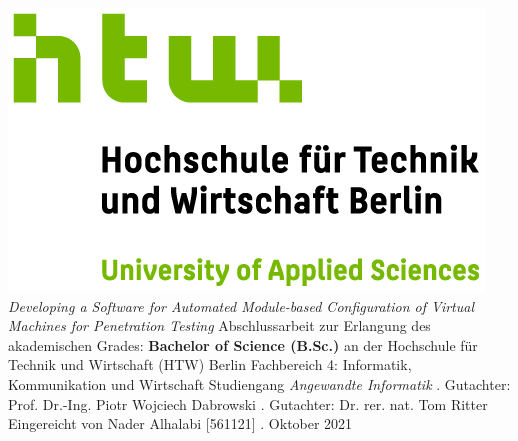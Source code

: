 \begin{titlepage}
\begin{center}
\includegraphics{resources/logo/HTW_Berlin_Logo_farbig.jpg}
\linebreak[4]
\linebreak[4]
\linebreak[4]
\linebreak[4]
\textit{\large Developing a Software for Automated
Module-based Configuration of Virtual Machines
for Penetration Testing}
\linebreak[4]
\linebreak[4]
\linebreak[4]
Abschlussarbeit
\linebreak[4]
\linebreak[4]
zur Erlangung des akademischen Grades:
\linebreak[4]
\linebreak[4]
\textbf{Bachelor of Science (B.Sc.)}
\linebreak[4]
\linebreak[4]
an der
\linebreak[4]
\linebreak[4]
Hochschule f\"ur Technik und Wirtschaft (HTW) Berlin
\linebreak[4]
Fachbereich 4: Informatik, Kommunikation und Wirtschaft
\linebreak[4]
Studiengang \textit{Angewandte Informatik}
\linebreak[4]
\linebreak[4]
. Gutachter: Prof. Dr.-Ing. Piotr Wojciech Dabrowski
. Gutachter: Dr. rer. nat. Tom Ritter
\linebreak[4]
\linebreak[4]
\linebreak[4]
\linebreak[4]
\linebreak[4]
Eingereicht von Nader Alhalabi [561121]
\linebreak[4]
\linebreak[4]
\linebreak[4]
. Oktober 2021

\end{center}
\end{titlepage}
\newpage
